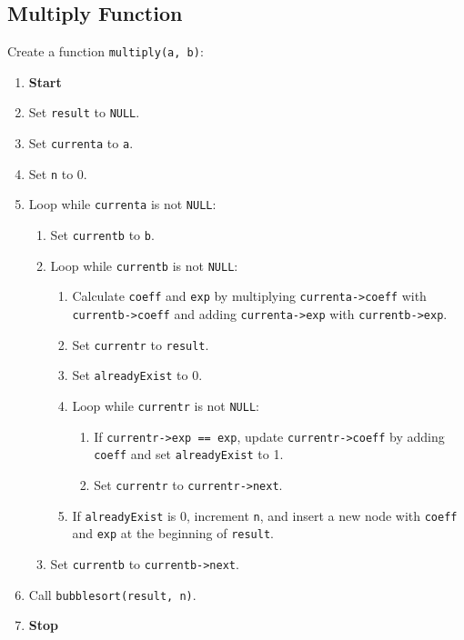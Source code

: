 {  \subsection{Multiply Function}
  Create a function \texttt{multiply(a, b)}:
  \begin{enumerate}[label=\arabic*:,left=0pt]
    \item \textbf{Start}
    \item Set \texttt{result} to \texttt{NULL}.
    \item Set \texttt{currenta} to \texttt{a}.
    \item Set \texttt{n} to 0.
    \item Loop while \texttt{currenta} is not \texttt{NULL}:
          \begin{enumerate}[label=2.\arabic*:, start=1]
            \item Set \texttt{currentb} to \texttt{b}.
            \item Loop while \texttt{currentb} is not \texttt{NULL}:
                  \begin{enumerate}[label=2.2.\arabic*:, start=1]
                    \item Calculate \texttt{coeff} and \texttt{exp} by multiplying \texttt{currenta->coeff} with \texttt{currentb->coeff} \newline and adding \texttt{currenta->exp} with \texttt{currentb->exp}.
                    \item Set \texttt{currentr} to \texttt{result}.
                    \item Set \texttt{alreadyExist} to 0.
                    \item Loop while \texttt{currentr} is not \texttt{NULL}:
                          \begin{enumerate}[label=2.2.3.\arabic*:, start=1]
                            \item If \texttt{currentr->exp == exp}, update \texttt{currentr->coeff} by adding \texttt{coeff} and \newline set \texttt{alreadyExist} to 1.
                            \item Set \texttt{currentr} to \texttt{currentr->next}.
                          \end{enumerate}
                    \item If \texttt{alreadyExist} is 0, increment \texttt{n}, and insert a new node with \texttt{coeff} and \texttt{exp} at the \newline beginning of \texttt{result}.
                  \end{enumerate}
            \item Set \texttt{currentb} to \texttt{currentb->next}.
          \end{enumerate}
    \item Call \texttt{bubblesort(result, n)}.
    \item \textbf{Stop}
  \end{enumerate}

}
